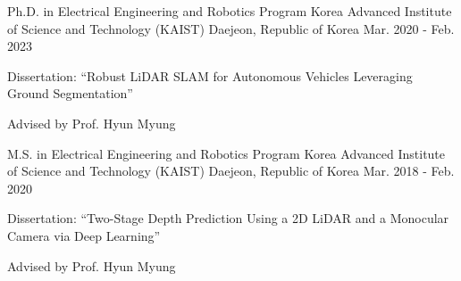 

\begin{cventries}
%
%
  \cventry
  {Ph.D. in Electrical Engineering and Robotics Program} %
  {Korea Advanced Institute of Science and Technology (KAIST)} %
  {Daejeon, Republic of Korea} %
  {Mar. 2020 - Feb. 2023} %
  {
    \begin{cvitems} %
      \item {Dissertation: ``Robust LiDAR SLAM for Autonomous Vehicles Leveraging Ground Segmentation''}
      \item {Advised by Prof. Hyun Myung}
    \end{cvitems}
  }

  \cventry
  {M.S. in Electrical Engineering and Robotics Program} %
  {Korea Advanced Institute of Science and Technology (KAIST)} %
  {Daejeon, Republic of Korea} %
  {Mar. 2018 - Feb. 2020} %
  {
    \begin{cvitems} %
      \item {Dissertation: ``Two-Stage Depth Prediction Using a 2D LiDAR and a Monocular Camera via Deep Learning''}
      \item {Advised by Prof. Hyun Myung}
    \end{cvitems}
  }


\end{cventries}
